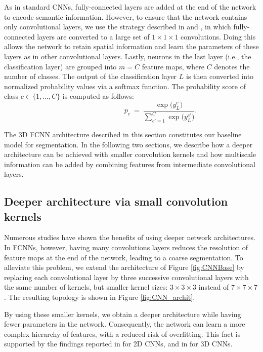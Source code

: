 \documentclass[twoside,fleqn,espcrc2]{elsarticle}
\newcommand{\vold}[1]{$#1\!\times\!#1\!\times\!#1$}
\begin{document}
As in standard CNNs, fully-connected layers are added at the end of the network to encode semantic information. However, to ensure that the network contains only convolutional layers, we use the strategy described in \cite{long2015fully} and \cite{kamnitsas2016efficient}, in which fully-connected layers are converted to a large set of \vold{1} convolutions. Doing this allows the network to retain spatial information and learn the parameters of these layers as in other convolutional layers. Lastly, neurons in the last layer (i.e., the classification layer) are grouped into $m=C$ feature maps, where $C$ denotes the number of classes. The output of the classification layer $L$ is then converted into normalized probability values via a softmax function. The probability score of class $c \in \{1, \ldots, C\}$ is computed as follows:
\begin{equation}
    \qquad \qquad \qquad \qquad \
        p_c \ = \ \frac{\exp\big(y^c_L\big)}{\sum^{C}_{c'=1} \exp\big(y^{c'}_L\big)}.
\end{equation}

The 3D FCNN architecture described in this section constitutes our baseline model for segmentation. In the following two sections, we describe how a deeper architecture can be achieved with smaller convolution kernels and how multiscale information can be added by combining features from intermediate convolutional layers.


\subsection{Deeper architecture via small convolution kernels} 
\label{ssec:smallKernels}

Numerous studies have shown the benefits of using deeper network architectures. In FCNNs, however, having many convolutions layers reduces the resolution of feature maps at the end of the network, leading to a coarse segmentation. To alleviate this problem, we extend the architecture of Figure \ref{fig:CNNBase} by replacing each convolutional layer by three successive convolutional layers with the same number of kernels, but smaller kernel sizes: \vold{3} instead of \vold{7}. The resulting topology is shown in Figure \ref{fig:CNN_archit}.

By using these smaller kernels, we obtain a deeper architecture while having fewer parameters in the network. Consequently, the network can learn a more complex hierarchy of features, with a reduced risk of overfitting. This fact is supported by the findings reported in \cite{simonyan2014very} for 2D CNNs, and in \cite{kamnitsas2016efficient} for 3D CNNs. %
\end{document}

